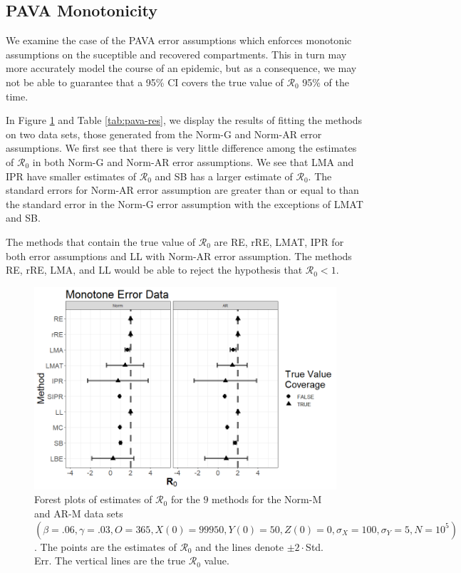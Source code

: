 \documentclass[12pt]{article}
\newcommand{\xxsir}{\ensuremath{9} } %
\newcommand{\rr}{\ensuremath{\mathcal{R}_0}}
\begin{document}
\subsection{PAVA Monotonicity}\label{sec:res-PAVA}
We examine the case of the PAVA error assumptions which enforces monotonic assumptions on the suceptible and recovered compartments.  This in turn may more accurately model the course of an epidemic, but as a consequence, we may not be able to guarantee that a 95\% CI covers the true value of $\rr$ 95\% of the time.

In Figure \ref{fig:pava-res} and Table \ref{tab:pava-res}, we display the results of fitting the methods on two data sets, those generated from the Norm-G and Norm-AR error assumptions.  We first see that there is very little difference among the estimates of $\rr$ in both Norm-G and Norm-AR error assumptions.  We see that LMA and IPR have smaller estimates of $\rr$ and SB has a larger estimate of $\rr$.  The standard errors for Norm-AR error assumption are greater than or equal to than the standard error in the Norm-G error assumption with the exceptions of LMAT and SB.

The methods that contain the true value of $\rr$ are RE, rRE, LMAT, IPR for both error assumptions and LL with Norm-AR error assumption.  The methods RE, rRE, LMA, and LL would be able to reject the hypothesis that $\rr < 1$.

\begin{figure}[H]
	\centering
	\includegraphics[scale=0.5]{images/mono.tiff}
	\caption{Forest plots of estimates of $\rr$ for the \xxsir methods for the Norm-M and AR-M data sets $(\beta=.06, \gamma=.03, O=365, X(0)=99950, Y(0)=50, Z(0)=0, \sigma_X=100, \sigma_Y=5, N=10^5)$.  The points are the estimates of $\rr$ and the lines denote $\pm 2\cdot $Std. Err.  The vertical lines are the true $\rr$ value.}
	\label{fig:pava-res}
\end{figure}
\end{document}
